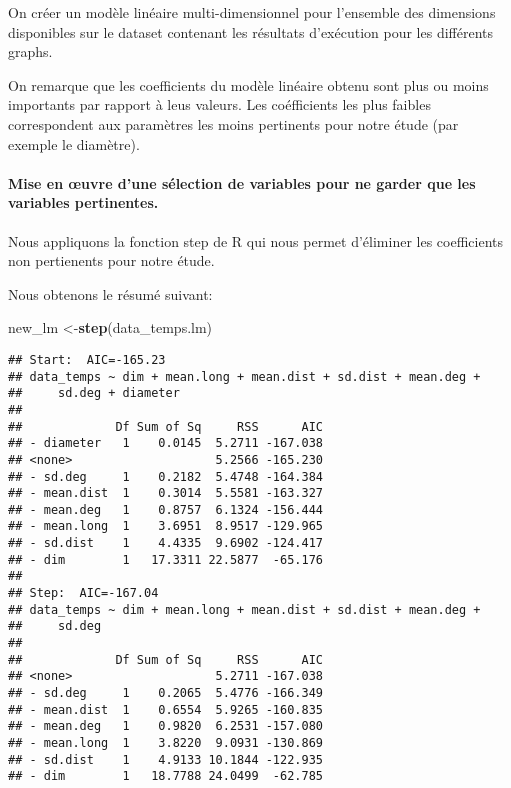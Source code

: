 \documentclass[
]{article}
\newenvironment{Shaded}{\begin{snugshade}}{\end{snugshade}}
\newcommand{\KeywordTok}[1]{\textcolor[rgb]{0.13,0.29,0.53}{\textbf{#1}}}
\newcommand{\NormalTok}[1]{#1}
\begin{document}
On créer un modèle linéaire multi-dimensionnel pour l'ensemble des
dimensions disponibles sur le dataset contenant les résultats
d'exécution pour les différents graphs.

On remarque que les coefficients du modèle linéaire obtenu sont plus ou
moins importants par rapport à leus valeurs. Les coéfficients les plus
faibles correspondent aux paramètres les moins pertinents pour notre
étude (par exemple le diamètre).

\hypertarget{mise-en-uvre-dune-suxe9lection-de-variables-pour-ne-garder-que-les-variables-pertinentes.}{%
\paragraph{\texorpdfstring{Mise en \oe uvre d'une sélection de variables
pour ne garder que les variables
pertinentes.}{Mise en uvre d'une sélection de variables pour ne garder que les variables pertinentes.}}\label{mise-en-uvre-dune-suxe9lection-de-variables-pour-ne-garder-que-les-variables-pertinentes.}}

Nous appliquons la fonction step de R qui nous permet d'éliminer les
coefficients non pertienents pour notre étude.

Nous obtenons le résumé suivant:

\begin{Shaded}
\begin{Highlighting}[]
\NormalTok{new_lm <-}\KeywordTok{step}\NormalTok{(data_temps.lm)}
\end{Highlighting}
\end{Shaded}

\begin{verbatim}
## Start:  AIC=-165.23
## data_temps ~ dim + mean.long + mean.dist + sd.dist + mean.deg + 
##     sd.deg + diameter
## 
##             Df Sum of Sq     RSS      AIC
## - diameter   1    0.0145  5.2711 -167.038
## <none>                    5.2566 -165.230
## - sd.deg     1    0.2182  5.4748 -164.384
## - mean.dist  1    0.3014  5.5581 -163.327
## - mean.deg   1    0.8757  6.1324 -156.444
## - mean.long  1    3.6951  8.9517 -129.965
## - sd.dist    1    4.4335  9.6902 -124.417
## - dim        1   17.3311 22.5877  -65.176
## 
## Step:  AIC=-167.04
## data_temps ~ dim + mean.long + mean.dist + sd.dist + mean.deg + 
##     sd.deg
## 
##             Df Sum of Sq     RSS      AIC
## <none>                    5.2711 -167.038
## - sd.deg     1    0.2065  5.4776 -166.349
## - mean.dist  1    0.6554  5.9265 -160.835
## - mean.deg   1    0.9820  6.2531 -157.080
## - mean.long  1    3.8220  9.0931 -130.869
## - sd.dist    1    4.9133 10.1844 -122.935
## - dim        1   18.7788 24.0499  -62.785
\end{verbatim}
\end{document}
